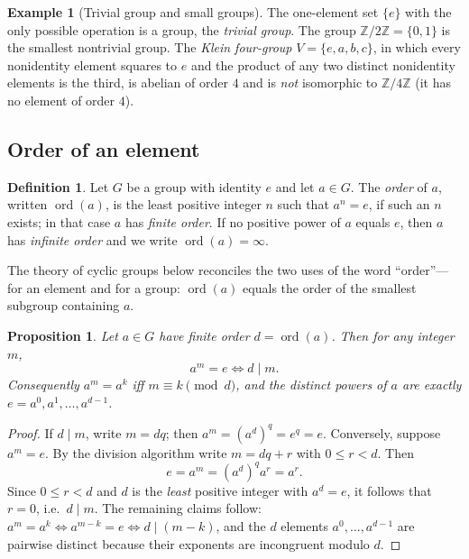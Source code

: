 \documentclass[11pt,a4paper]{article}
\newtheorem{proposition}[theorem]{Proposition}
\theoremstyle{definition}
\newtheorem{definition}[theorem]{Definition}
\newtheorem{example}[theorem]{Example}
\theoremstyle{remark}
\newcommand{\Z}{\ensuremath{\mathbb{Z}}}
\DeclareMathOperator{\ord}{ord}
\begin{document}
\begin{example}[Trivial group and small groups]\label{groups:exa-trivial}
The one-element set \(\{e\}\) with the only possible operation is a group, the \emph{trivial group}. The group \(\Z/2\Z = \{0,1\}\) is the smallest nontrivial group. The \emph{Klein four-group} \(V = \{e,a,b,c\}\), in which every nonidentity element squares to \(e\) and the product of any two distinct nonidentity elements is the third, is abelian of order \(4\) and is \emph{not} isomorphic to \(\Z/4\Z\) (it has no element of order \(4\)).
\end{example}

\subsection{Order of an element}

\begin{definition}\label{groups:def-order-elt}
Let \(G\) be a group with identity \(e\) and let \(a \in G\). The \emph{order} of \(a\), written \(\ord(a)\), is the least positive integer \(n\) such that \(a^n = e\), if such an \(n\) exists; in that case \(a\) has \emph{finite order}. If no positive power of \(a\) equals \(e\), then \(a\) has \emph{infinite order} and we write \(\ord(a) = \infty\).
\end{definition}

The theory of cyclic groups below reconciles the two uses of the word ``order''---for an element and for a group: \(\ord(a)\) equals the order of the smallest subgroup containing \(a\).

\begin{proposition}\label{groups:prop-order-divides}
Let \(a \in G\) have finite order \(d = \ord(a)\). Then for any integer \(m\),
\[
a^m = e \iff d \mid m.
\]
Consequently \(a^m = a^k\) iff \(m \equiv k \pmod d\), and the distinct powers of \(a\) are exactly \(e = a^0, a^1, \dots, a^{d-1}\).
\end{proposition}

\begin{proof}
If \(d \mid m\), write \(m = dq\); then \(a^m = (a^d)^q = e^q = e\). Conversely, suppose \(a^m = e\). By the division algorithm write \(m = dq + r\) with \(0 \le r < d\). Then
\[
e = a^m = (a^d)^q a^r = a^r.
\]
Since \(0 \le r < d\) and \(d\) is the \emph{least} positive integer with \(a^d = e\), it follows that \(r = 0\), i.e.\ \(d \mid m\). The remaining claims follow: \(a^m = a^k \iff a^{m-k} = e \iff d \mid (m-k)\), and the \(d\) elements \(a^0,\dots,a^{d-1}\) are pairwise distinct because their exponents are incongruent modulo \(d\).
\end{proof}
\end{document}
